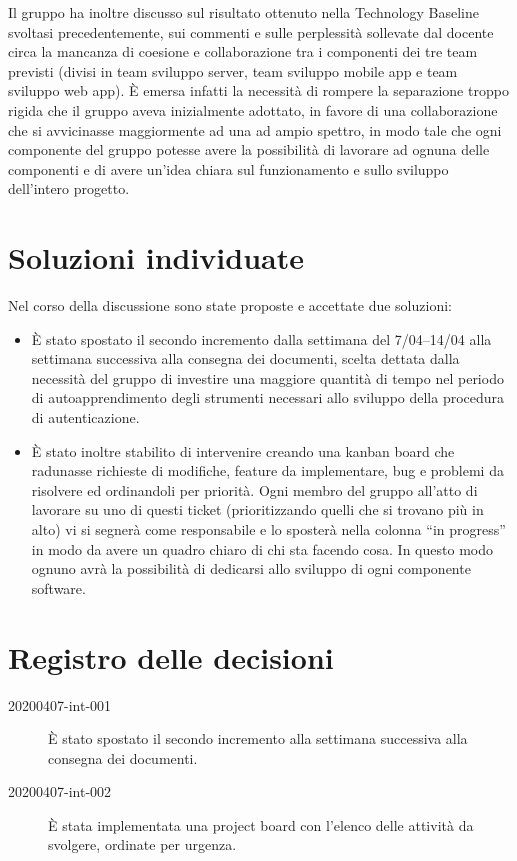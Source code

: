 \documentclass{article}
\begin{document}
Il gruppo ha inoltre discusso sul risultato ottenuto nella Technology Baseline svoltasi precedentemente, sui commenti e sulle perplessità sollevate dal docente circa la mancanza di coesione e collaborazione tra i componenti dei tre team previsti (divisi in team sviluppo server, team sviluppo mobile app e team sviluppo web app).
È emersa infatti la necessità di rompere la separazione troppo rigida che il gruppo aveva inizialmente adottato, in favore di una collaborazione che si avvicinasse maggiormente ad una ad ampio spettro, in modo tale che ogni componente del gruppo potesse avere la possibilità di lavorare ad ognuna delle componenti e di avere un'idea chiara sul funzionamento e sullo sviluppo dell'intero progetto.

\section{Soluzioni individuate}%
\label{sec:soluzioni_individuate}

Nel corso della discussione sono state proposte e accettate due soluzioni:
\begin{itemize}
  \item È stato spostato il secondo incremento dalla settimana del 7/04--14/04 alla settimana successiva alla consegna dei documenti, scelta dettata dalla necessità del gruppo di investire una maggiore quantità di tempo nel periodo di autoapprendimento degli strumenti necessari allo sviluppo della procedura di autenticazione.
  \item È stato inoltre stabilito di intervenire creando una kanban board che radunasse richieste di modifiche, feature da implementare, bug e problemi da risolvere ed ordinandoli per priorità. Ogni membro del gruppo all'atto di lavorare su uno di questi ticket (prioritizzando quelli che si trovano più in alto) vi si segnerà come responsabile e lo sposterà nella colonna ``in progress'' in modo da avere un quadro chiaro di chi sta facendo cosa. In questo modo ognuno avrà la possibilità di dedicarsi allo sviluppo di ogni componente software.
\end{itemize}

\newpage
\section{Registro delle decisioni}%
\label{sec:registro_delle_decisioni}

\begin{description}
  \item[20200407-int-001] È stato spostato il secondo incremento alla settimana successiva alla consegna dei documenti.
  \item[20200407-int-002] È stata implementata una project board con l'elenco delle attività da svolgere, ordinate per urgenza.
\end{description}

\end{document}
